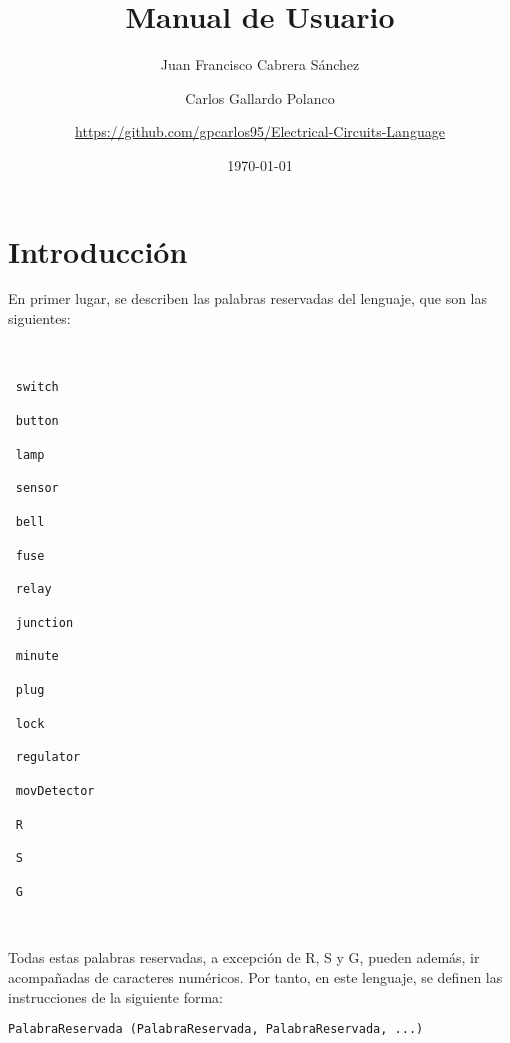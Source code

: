 \documentclass{article}
\author{Juan Francisco Cabrera Sánchez \and Carlos Gallardo Polanco \and \newline \url{https://github.com/gpcarlos95/Electrical-Circuits-Language}}
\title{Manual de Usuario}
\date{\today}
\begin{document}
\maketitle

\section{Introducción}

En primer lugar, se describen las palabras reservadas del lenguaje, que son las siguientes:

\

\begin{center}
\begin{enumerate*}
  \item[$\ $]\texttt{switch}
  \item[$\ $]\texttt{button}
  \item[$\ $]\texttt{lamp}
  \item[$\ $]\texttt{sensor}
  \item[$\ $]\texttt{bell}
  \item[$\ $]\texttt{fuse}
  \item[$\ $]\texttt{relay}
  \item[$\ $]\texttt{junction}

\end{enumerate*}
\end{center}

\begin{center}
  \begin{enumerate*}
  \item[$\ $]\texttt{minute}
  \item[$\ $]\texttt{plug}
  \item[$\ $]\texttt{lock}
  \item[$\ $]\texttt{regulator}
  \item[$\ $]\texttt{movDetector}
  \item[$\ $]\texttt{R}
  \item[$\ $]\texttt{S}
  \item[$\ $]\texttt{G}
  \end{enumerate*}
\end{center}

\

Todas estas palabras reservadas, a excepción de R, S y G, pueden además, ir acompañadas de caracteres numéricos. Por tanto, en este lenguaje, se definen las instrucciones de la siguiente forma:

\begin{center} \texttt{PalabraReservada  (PalabraReservada, PalabraReservada, ...)} \end{center}
\end{document}
